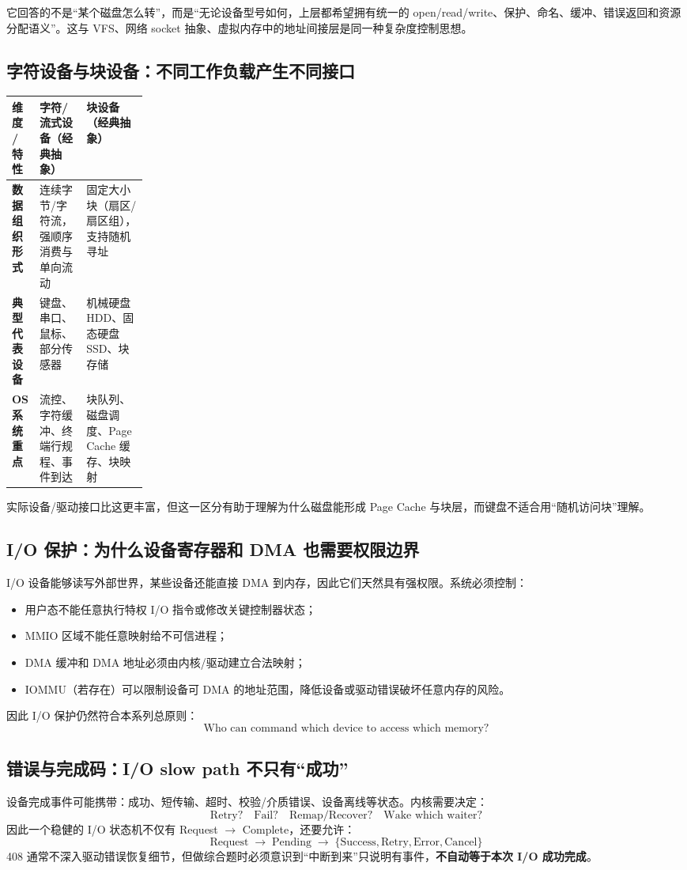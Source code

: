\documentclass[11pt,a4paper]{ctexart}
\newcommand{\kw}[1]{\textbf{#1}}
\newcommand{\arr}{\;\longrightarrow\;}
\begin{document}
\begin{exam}
它回答的不是“某个磁盘怎么转”，而是“无论设备型号如何，上层都希望拥有统一的 open/read/write、保护、命名、缓冲、错误返回和资源分配语义”。这与 VFS、网络 socket 抽象、虚拟内存中的地址间接层是同一种复杂度控制思想。
\end{exam}

\subsection{字符设备与块设备：不同工作负载产生不同接口}
\begingroup
\small
\renewcommand{\arraystretch}{1.25}
\setlength{\tabcolsep}{6pt}
\begin{tabularx}{\linewidth}{>{\bfseries}p{0.2\linewidth} X X}
\toprule
维度 / 特性 & 字符/流式设备（经典抽象） & 块设备（经典抽象） \\
\midrule
数据组织形式 & 连续字节/字符流，强顺序消费与单向流动 & 固定大小块（扇区/扇区组），支持随机寻址 \\
典型代表设备 & 键盘、串口、鼠标、部分传感器 & 机械硬盘 HDD、固态硬盘 SSD、块存储 \\
OS 系统重点 & 流控、字符缓冲、终端行规程、事件到达 & 块队列、磁盘调度、Page Cache 缓存、块映射 \\
\bottomrule
\end{tabularx}
\endgroup
实际设备/驱动接口比这更丰富，但这一区分有助于理解为什么磁盘能形成 Page Cache 与块层，而键盘不适合用“随机访问块”理解。

\subsection{I/O 保护：为什么设备寄存器和 DMA 也需要权限边界}
I/O 设备能够读写外部世界，某些设备还能直接 DMA 到内存，因此它们天然具有强权限。系统必须控制：
\begin{itemize}
  \item 用户态不能任意执行特权 I/O 指令或修改关键控制器状态；
  \item MMIO 区域不能任意映射给不可信进程；
  \item DMA 缓冲和 DMA 地址必须由内核/驱动建立合法映射；
  \item IOMMU（若存在）可以限制设备可 DMA 的地址范围，降低设备或驱动错误破坏任意内存的风险。
\end{itemize}
因此 I/O 保护仍然符合本系列总原则：
\[
\boxed{\text{Who can command which device to access which memory?}}
\]

\subsection{错误与完成码：I/O slow path 不只有“成功”}
设备完成事件可能携带：成功、短传输、超时、校验/介质错误、设备离线等状态。内核需要决定：
\[
\text{Retry?}\quad\text{Fail?}\quad\text{Remap/Recover?}\quad\text{Wake which waiter?}
\]
因此一个稳健的 I/O 状态机不仅有 Request $\to$ Complete，还要允许：
\[
\boxed{\text{Request}\arr\text{Pending}\arr\{\text{Success},\text{Retry},\text{Error},\text{Cancel}\}}
\]
408 通常不深入驱动错误恢复细节，但做综合题时必须意识到“中断到来”只说明有事件，\kw{不自动等于本次 I/O 成功完成}。
\end{document}
